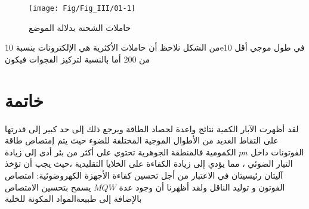 \begin{figure}[h!]
 	\centering
 	\texttt{[image: Fig/Fig\_III/01-1]}
 	\caption{حاملات الشحنة بدلالة الموضع }
 	\label{fig:01-1}
 \end{figure}
 \FloatBarrier
 من الشكل نلاحظ أن حاملات الأكثرية هي الإلكترونات بنسبة  10e10 في طول موجي أقل من 200  أما بالنسبة لتركيز الفجوات فيكون
 \section{ خاتمة}
    لقد أظهرت الآبار الكمية نتائج واعدة لحصاد الطاقة  ويرجع ذلك إلى حد كبير  إلى  قدرتها على التقاط العديد من الأطوال الموجية المختلفة للضوء حيث  يتم إمتصاص طاقة الفوتونات داخل $ pn $ الكمومية   فالمنطقة الجوهرية تحتوي على أكثر من بئر أدى إلى زيادة التيار الضوئي ، مما يؤدي إلى زيادة الكفاءة على الخلايا التقليدية ،حيث يجب أن تؤخذ آليتان رئيسيتان في الاعتبار من أجل تحسين كفاءة الأجهزة الكهروضوئية: امتصاص الفوتون و توليد  الناقل ولقد أظهرنا أن وجود عدة $ MQW  $ يسمح بتحسين الامتصاص بالإضافة إلى طبيعةالمواد  المكونة للخلية 
 
 
 